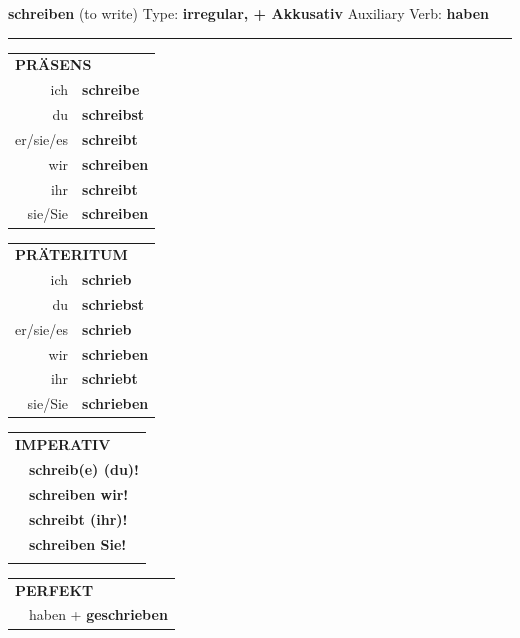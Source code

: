 \documentclass[10pt,a4paper]{revtex4-2}
\begin{document}
\begin{verbbox-acc}
    {\Large \bf schreiben} (to write) \hfill Type: \textbf{irregular, + Akkusativ} \hfill Auxiliary Verb: \textbf{haben} 
    
     \vspace{5pt}

    \hrule
    
    \vspace{5pt}

  \begin{tabular}{rl}
     \multicolumn{2}{l}{\textbf{PRÄSENS} }\\
    ich & \textbf{schreibe}\\
    du & \textbf{schreibst}\\
    er/sie/es & \textbf{schreibt}\\
    wir & \textbf{schreiben}\\
    ihr & \textbf{schreibt}\\
    sie/Sie & \textbf{schreiben}\\
  \end{tabular}
  \hfill
     \begin{tabular}{rl}
    \multicolumn{2}{l}{\textbf{PRÄTERITUM} }\\
    ich & \textbf{schrieb}\\
    du & \textbf{schriebst}\\
    er/sie/es & \textbf{schrieb}\\
    wir & \textbf{schrieben}\\
    ihr & \textbf{schriebt}\\
    sie/Sie & \textbf{schrieben}\\
  \end{tabular}
  \hfill
  \begin{tabular}{rl}
     \multicolumn{2}{l}{\textbf{IMPERATIV} }\\
   & \textbf{schreib(e) (du)!}\\
   & \textbf{schreiben wir!}\\
   & \textbf{schreibt (ihr)!}\\
   & \textbf{schreiben Sie!}\\
   & \vspace{10pt}
  \end{tabular}

    \vspace{10pt}

 \begin{tabular}{rl}
     \multicolumn{2}{l}{\textbf{PERFEKT}}\\
  &  haben + \textbf{geschrieben}\\
  \end{tabular}
\hfill
   \begin{tabular}{rl}
   

\end{tabular}
\end{verbbox-acc}
\end{document}
